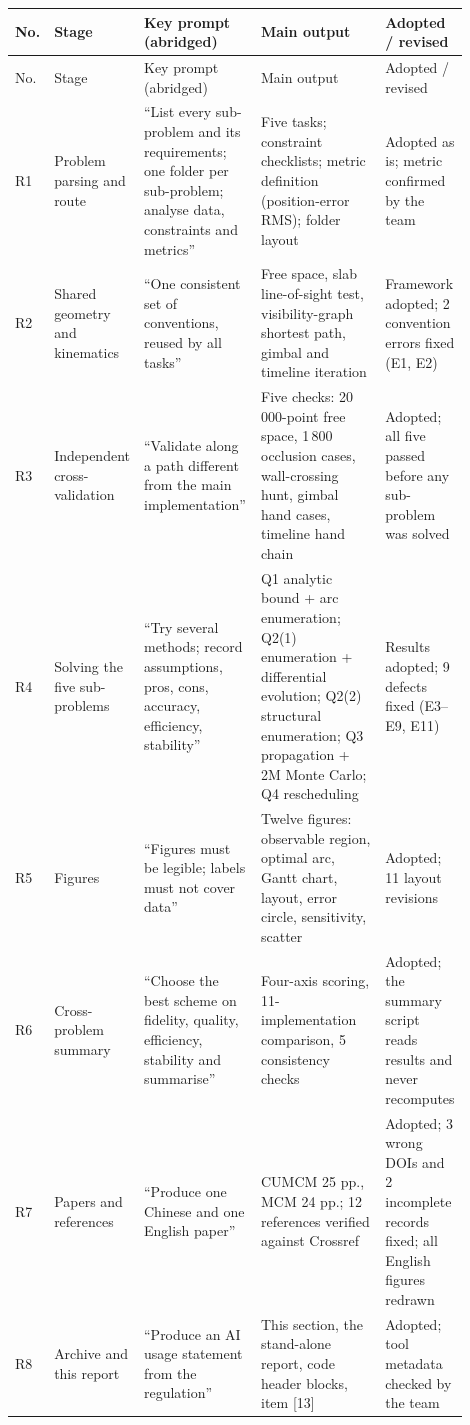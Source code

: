 {\begin{longtable}{@{}>{\raggedright\arraybackslash}p{0.04\linewidth}
                 >{\raggedright\arraybackslash}p{0.125\linewidth}
                 >{\raggedright\arraybackslash}p{0.26\linewidth}
                 >{\raggedright\arraybackslash}p{0.30\linewidth}
                 >{\raggedright\arraybackslash}p{0.17\linewidth}@{}}
\toprule
No. & Stage & Key prompt (abridged) & Main output & Adopted / revised \\
\midrule
\endfirsthead
\toprule
No. & Stage & Key prompt (abridged) & Main output & Adopted / revised \\
\midrule
\endhead
\bottomrule
\endlastfoot
R1 & Problem parsing and route & ``List every sub-problem and its requirements; one folder per sub-problem; analyse data, constraints and metrics'' & Five tasks; constraint checklists; metric definition (position-error RMS); folder layout & Adopted as is; metric confirmed by the team \\
R2 & Shared geometry and kinematics & ``One consistent set of conventions, reused by all tasks'' & Free space, slab line-of-sight test, visibility-graph shortest path, gimbal and timeline iteration & Framework adopted; 2 convention errors fixed (E1, E2) \\
R3 & Independent cross-validation & ``Validate along a path different from the main implementation'' & Five checks: 20\,000-point free space, 1\,800 occlusion cases, wall-crossing hunt, gimbal hand cases, timeline hand chain & Adopted; all five passed before any sub-problem was solved \\
R4 & Solving the five sub-problems & ``Try several methods; record assumptions, pros, cons, accuracy, efficiency, stability'' & Q1 analytic bound + arc enumeration; Q2(1) enumeration + differential evolution; Q2(2) structural enumeration; Q3 propagation + 2M Monte Carlo; Q4 rescheduling & Results adopted; 9 defects fixed (E3--E9, E11) \\
R5 & Figures & ``Figures must be legible; labels must not cover data'' & Twelve figures: observable region, optimal arc, Gantt chart, layout, error circle, sensitivity, scatter & Adopted; 11 layout revisions \\
R6 & Cross-problem summary & ``Choose the best scheme on fidelity, quality, efficiency, stability and summarise'' & Four-axis scoring, 11-implementation comparison, 5 consistency checks & Adopted; the summary script reads results and never recomputes \\
R7 & Papers and references & ``Produce one Chinese and one English paper'' & CUMCM 25 pp., MCM 24 pp.; 12 references verified against Crossref & Adopted; 3 wrong DOIs and 2 incomplete records fixed; all English figures redrawn \\
R8 & Archive and this report & ``Produce an AI usage statement from the regulation'' & This section, the stand-alone report, code header blocks, item [13] & Adopted; tool metadata checked by the team \\
\end{longtable}

}
